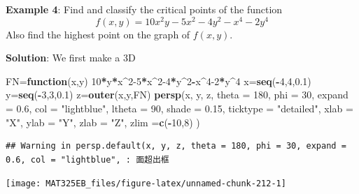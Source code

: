 \documentclass[
]{book}
\newenvironment{Shaded}{\begin{snugshade}}{\end{snugshade}}
\newcommand{\AttributeTok}[1]{\textcolor[rgb]{0.13,0.29,0.53}{#1}}
\newcommand{\ControlFlowTok}[1]{\textcolor[rgb]{0.13,0.29,0.53}{\textbf{#1}}}
\newcommand{\DecValTok}[1]{\textcolor[rgb]{0.00,0.00,0.81}{#1}}
\newcommand{\FloatTok}[1]{\textcolor[rgb]{0.00,0.00,0.81}{#1}}
\newcommand{\FunctionTok}[1]{\textcolor[rgb]{0.13,0.29,0.53}{\textbf{#1}}}
\newcommand{\NormalTok}[1]{#1}
\newcommand{\OtherTok}[1]{\textcolor[rgb]{0.56,0.35,0.01}{#1}}
\newcommand{\SpecialCharTok}[1]{\textcolor[rgb]{0.81,0.36,0.00}{\textbf{#1}}}
\newcommand{\StringTok}[1]{\textcolor[rgb]{0.31,0.60,0.02}{#1}}
\begin{document}
\hfill\break

\textbf{Example 4}: Find and classify the critical points of the function
\[
f(x,y) = 10x^2y - 5x^2 - 4y^2 - x^4 - 2y^4
\]
Also find the highest point on the graph of \(f(x,y)\).

\textbf{Solution}: We first make a 3D

\begin{Shaded}
\begin{Highlighting}[]
\NormalTok{FN}\OtherTok{=}\ControlFlowTok{function}\NormalTok{(x,y) }\DecValTok{10}\SpecialCharTok{*}\NormalTok{y}\SpecialCharTok{*}\NormalTok{x}\SpecialCharTok{\^{}}\DecValTok{2{-}5}\SpecialCharTok{*}\NormalTok{x}\SpecialCharTok{\^{}}\DecValTok{2{-}4}\SpecialCharTok{*}\NormalTok{y}\SpecialCharTok{\^{}}\DecValTok{2}\SpecialCharTok{{-}}\NormalTok{x}\SpecialCharTok{\^{}}\DecValTok{4{-}2}\SpecialCharTok{*}\NormalTok{y}\SpecialCharTok{\^{}}\DecValTok{4}
\NormalTok{x}\OtherTok{=}\FunctionTok{seq}\NormalTok{(}\SpecialCharTok{{-}}\DecValTok{4}\NormalTok{,}\DecValTok{4}\NormalTok{,}\FloatTok{0.1}\NormalTok{)}
\NormalTok{y}\OtherTok{=}\FunctionTok{seq}\NormalTok{(}\SpecialCharTok{{-}}\DecValTok{3}\NormalTok{,}\DecValTok{3}\NormalTok{,}\FloatTok{0.1}\NormalTok{)}
\NormalTok{z}\OtherTok{=}\FunctionTok{outer}\NormalTok{(x,y,FN)}
\FunctionTok{persp}\NormalTok{(x, y, z, }\AttributeTok{theta =} \DecValTok{180}\NormalTok{, }\AttributeTok{phi =} \DecValTok{30}\NormalTok{, }\AttributeTok{expand =} \FloatTok{0.6}\NormalTok{, }\AttributeTok{col =} \StringTok{"lightblue"}\NormalTok{, }\AttributeTok{ltheta =} \DecValTok{90}\NormalTok{, }
\AttributeTok{shade =} \FloatTok{0.15}\NormalTok{, }\AttributeTok{ticktype =} \StringTok{"detailed"}\NormalTok{, }\AttributeTok{xlab =} \StringTok{"X"}\NormalTok{, }\AttributeTok{ylab =} \StringTok{"Y"}\NormalTok{, }\AttributeTok{zlab =} \StringTok{"Z"}\NormalTok{, }\AttributeTok{zlim =}\FunctionTok{c}\NormalTok{(}\SpecialCharTok{{-}}\DecValTok{10}\NormalTok{,}\DecValTok{8}\NormalTok{)}
\NormalTok{)}
\end{Highlighting}
\end{Shaded}

\begin{verbatim}
## Warning in persp.default(x, y, z, theta = 180, phi = 30, expand = 0.6, col = "lightblue", : 面超出框
\end{verbatim}

\begin{center}\texttt{[image: MAT325EB\_files/figure-latex/unnamed-chunk-212-1]} \end{center}
\end{document}
